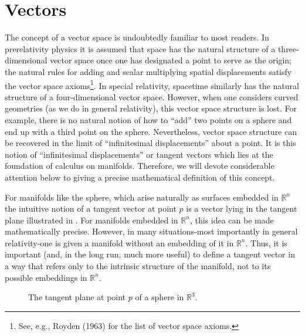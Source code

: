 \section{Vectors}
The concept of a vector space is undoubtedly familiar to most readers. In prerelativity physics it is assumed that space has the natural structure of a three-dimensional vector space once one has designated a point to serve as the origin; the natural rules for adding and scalar multiplying spatial displacements satisfy the vector space axioms\footnote{See, e.g., Royden (1963) for the list of vector space axioms.}. In special relativity, spacetime similarly has the natural structure of a four-dimensional vector space. However, when one considers curved geometries (as we do in general relativity), this vector space structure is lost. For example, there is no natural notion of how to ``add'' two points on a sphere and end up with a third point on the sphere. Nevertheless, vector space structure can be recovered in the limit of ``infinitesimal displacements'' about a point. It is this notion of ``infinitesimal displacements'' or tangent vectors which lies at the foundation of calculus on manifolds. Therefore, we will devote considerable attention below to giving a precise mathematical definition of this concept.

For manifolds like the sphere, which arise naturally as surfaces embedded in $\mathbb{R}^n$ the intuitive notion of a tangent vector at point $p$ is a vector lying in the tangent plane illustrated in . For manifolds embedded in $\mathbb{R}^n$, this idea can be made mathematically precise. However, in many situations-most importantly in general relativity-one is given a manifold without an embedding of it in $\mathbb{R}^n$. Thus, it is important (and, in the long run, much more useful) to define a tangent vector in a way that refers only to the intrinsic structure of the manifold, not to its possible embeddings in $\mathbb{R}^n$.

\begin{figure}[!ht]
\centering
{}
\caption{The tangent plane at point $p$ of a sphere in $\mathbb{R}^3$.}
\label{2.2}
\end{figure}

